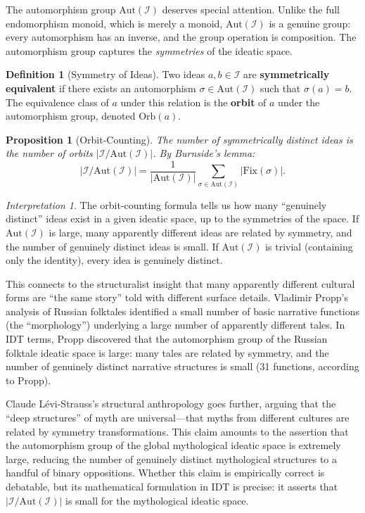 \documentclass[11pt,openany]{book}
\theoremstyle{definition}
\newtheorem{definition}[axiom]{Definition}
\theoremstyle{plain}
\newtheorem{proposition}[axiom]{Proposition}
\theoremstyle{remark}
\newtheorem{interpretation}[axiom]{Interpretation}
\newcommand{\IS}{\mathcal{I}}               %
\begin{document}
The automorphism group $\mathrm{Aut}(\IS)$ deserves special attention. Unlike the full endomorphism monoid, which is merely a monoid, $\mathrm{Aut}(\IS)$ is a genuine group: every automorphism has an inverse, and the group operation is composition. The automorphism group captures the \emph{symmetries} of the ideatic space.

\begin{definition}[Symmetry of Ideas]
Two ideas $a, b \in \IS$ are \textbf{symmetrically equivalent} if there exists an automorphism $\sigma \in \mathrm{Aut}(\IS)$ such that $\sigma(a) = b$. The equivalence class of $a$ under this relation is the \textbf{orbit} of $a$ under the automorphism group, denoted $\mathrm{Orb}(a)$.
\end{definition}

\begin{proposition}[Orbit-Counting]
The number of symmetrically distinct ideas is the number of orbits $|\IS/\mathrm{Aut}(\IS)|$. By Burnside's lemma:
\[
|\IS/\mathrm{Aut}(\IS)| = \frac{1}{|\mathrm{Aut}(\IS)|} \sum_{\sigma \in \mathrm{Aut}(\IS)} |\mathrm{Fix}(\sigma)|.
\]
\end{proposition}

\begin{interpretation}
The orbit-counting formula tells us how many ``genuinely distinct'' ideas exist in a given ideatic space, up to the symmetries of the space. If $\mathrm{Aut}(\IS)$ is large, many apparently different ideas are related by symmetry, and the number of genuinely distinct ideas is small. If $\mathrm{Aut}(\IS)$ is trivial (containing only the identity), every idea is genuinely distinct.

This connects to the structuralist insight that many apparently different cultural forms are ``the same story'' told with different surface details. Vladimir Propp's analysis of Russian folktales identified a small number of basic narrative functions (the ``morphology'') underlying a large number of apparently different tales. In IDT terms, Propp discovered that the automorphism group of the Russian folktale ideatic space is large: many tales are related by symmetry, and the number of genuinely distinct narrative structures is small (31 functions, according to Propp).

Claude L\'evi-Strauss's structural anthropology goes further, arguing that the ``deep structures'' of myth are universal---that myths from different cultures are related by symmetry transformations. This claim amounts to the assertion that the automorphism group of the global mythological ideatic space is extremely large, reducing the number of genuinely distinct mythological structures to a handful of binary oppositions. Whether this claim is empirically correct is debatable, but its mathematical formulation in IDT is precise: it asserts that $|\IS/\mathrm{Aut}(\IS)|$ is small for the mythological ideatic space.
\end{interpretation}
\end{document}
